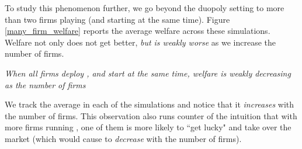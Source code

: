 \documentclass[../competing_bandits_with_appendix.tex]{subfiles}
\begin{document}
To study this phenomenon further, we go beyond the duopoly setting to more than two firms playing \DG (and starting at the same time). Figure \ref{many_firm_welfare} reports the average welfare
across these simulations. Welfare not only does not get better, \textit{but is weakly worse} as we increase the number of firms.

\begin{finding}
\textit{When all firms deploy \DG, and start at the same time, welfare is weakly decreasing as the number of firms }
\end{finding}


We track the average \Eeog in each of the
simulations and notice that it \textit{increases} with the number of firms.
This observation also runs counter of the intuition that with more firms running \DG, one of them is more likely to ``get lucky" and take over the market (which would cause \Eeog to \emph{decrease} with the number of firms).

\end{document}
